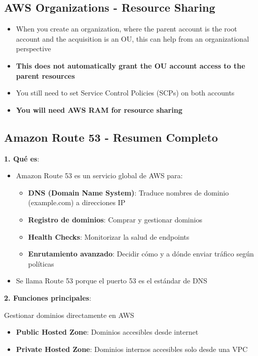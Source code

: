 \documentclass[12pt,a4paper]{report}
\newcommand{\important}[1]{\textcolor{dangerred}{\textbf{#1}}}
\begin{document}
\subsection{AWS Organizations - Resource Sharing}

\begin{itemize}
    \item When you create an organization, where the parent account is the root account and the acquisition is an OU, this can help from an organizational perspective
    \item \important{This does not automatically grant the OU account access to the parent resources}
    \item You still need to set Service Control Policies (SCPs) on both accounts
    \item \textbf{You will need AWS RAM for resource sharing}
\end{itemize}

\subsection{Amazon Route 53 - Resumen Completo}

\textbf{1. Qué es}:
\begin{itemize}
    \item Amazon Route 53 es un servicio global de AWS para:
    \begin{itemize}
        \item \textbf{DNS (Domain Name System)}: Traduce nombres de dominio (example.com) a direcciones IP
        \item \textbf{Registro de dominios}: Comprar y gestionar dominios
        \item \textbf{Health Checks}: Monitorizar la salud de endpoints
        \item \textbf{Enrutamiento avanzado}: Decidir cómo y a dónde enviar tráfico según políticas
    \end{itemize}
    \item Se llama Route 53 porque el puerto 53 es el estándar de DNS
\end{itemize}

\textbf{2. Funciones principales}:

\begin{conceptbox}
Gestionar dominios directamente en AWS
\end{conceptbox}

\begin{conceptbox}
\begin{itemize}
    \item \textbf{Public Hosted Zone}: Dominios accesibles desde internet
    \item \textbf{Private Hosted Zone}: Dominios internos accesibles solo desde una VPC
\end{itemize}
\end{conceptbox}
\end{document}
